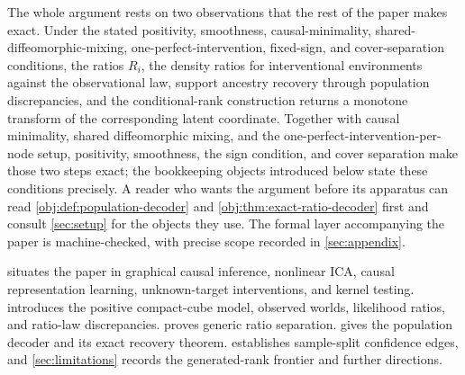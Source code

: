 The whole argument rests on two observations that the rest of the paper makes exact. Under the stated positivity, smoothness, causal-minimality, shared-diffeomorphic-mixing, one-perfect-intervention, fixed-sign, and cover-separation conditions, the ratios \(R_i\), the density ratios for interventional environments against the observational law, support ancestry recovery through population discrepancies, and the conditional-rank construction returns a monotone transform of the corresponding latent coordinate. Together with causal minimality, shared diffeomorphic mixing, and the one-perfect-intervention-per-node setup, positivity, smoothness, the sign condition, and cover separation make those two steps exact; the bookkeeping objects introduced below state these conditions precisely. A reader who wants the argument before its apparatus can read \cref{obj:def:population-decoder} and \cref{obj:thm:exact-ratio-decoder} first and consult \cref{sec:setup} for the objects they use. The formal layer accompanying the paper is machine-checked, with precise scope recorded in \cref{sec:appendix}.

 situates the paper in graphical causal inference, nonlinear ICA, causal representation learning, unknown-target interventions, and kernel testing.  introduces the positive compact-cube model, observed worlds, likelihood ratios, and ratio-law discrepancies.  proves generic ratio separation.  gives the population decoder and its exact recovery theorem.  establishes sample-split confidence edges, and \cref{sec:limitations} records the generated-rank frontier and further directions.
